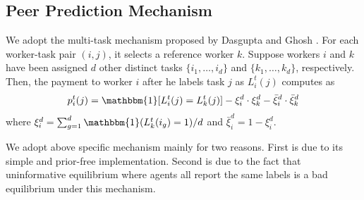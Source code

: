 \documentclass[letterpaper]{article} %
\begin{document}
\subsection{Peer Prediction Mechanism} 

We adopt the multi-task mechanism proposed by Dasgupta and Ghosh .  For each worker-task pair $(i, j)$, it selects a reference worker $k$. Suppose workers $i$ and $k$ have been assigned $d$ other distinct tasks $\{i_1,\ldots,i_d\}$ and $\{k_1,\ldots, k_d\}$, respectively. Then, the payment to worker $i$ after he labels task $j$ as $L^t_i(j)$ computes as
\begin{equation}
p^t_{i}(j)= \mathbbm{1}[L^{t}_i(j)=L^{t}_k(j)]- \xi_{i}^d\cdot \xi_{k}^d -\bar{\xi}_{i}^d\cdot \bar{\xi}_{k}^d
\end{equation}
where $\xi_{i}^{d}=\sum_{g=1}^{d}\mathbbm{1}(L^{t}_k(i_g)=1)/d$ and $\bar{\xi}_{i}^{d}=1-\xi_{i}^{d}$. 

We adopt above specific mechanism mainly for two reasons. First is due to its simple and prior-free implementation. Second is due to the fact that uninformative equilibrium where agents all report the same labels is a bad equilibrium under this mechanism.
\end{document}

